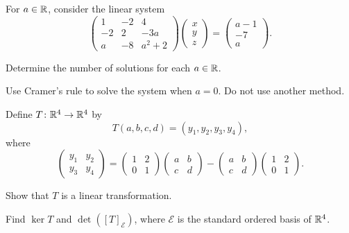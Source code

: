 \begin{problem}
For $a\in\mathbb{R}$, consider the linear system
\[
\begin{pmatrix}
1&-2&4\\
-2&2&-3a\\
a&-8&a^2+2
\end{pmatrix}
\begin{pmatrix}x\\y\\z\end{pmatrix}
=
\begin{pmatrix}a-1\\-7\\a\end{pmatrix}.
\]
\begin{problemsubparts}
\item Determine the number of solutions for each $a\in\mathbb{R}$.
\item Use Cramer's rule to solve the system when $a=0$. Do not use another method.
\end{problemsubparts}
\end{problem}

\begin{problem}
Define $T\colon\mathbb{R}^4\to\mathbb{R}^4$ by
\[
T(a,b,c,d)=(y_1,y_2,y_3,y_4),
\]
where
\[
\begin{pmatrix}y_1&y_2\\y_3&y_4\end{pmatrix}
=
\begin{pmatrix}1&2\\0&1\end{pmatrix}
\begin{pmatrix}a&b\\c&d\end{pmatrix}
-
\begin{pmatrix}a&b\\c&d\end{pmatrix}
\begin{pmatrix}1&2\\0&1\end{pmatrix}.
\]
\begin{problemsubparts}
\item Show that $T$ is a linear transformation.
\item Find $\ker T$ and $\det([T]_{\mathcal E})$, where $\mathcal E$ is the standard ordered basis of $\mathbb{R}^4$.
\end{problemsubparts}
\end{problem}

